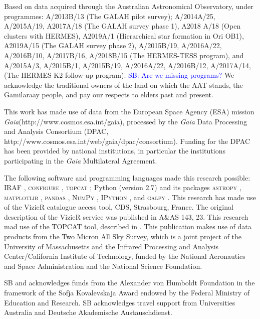 \documentclass[fleqn,usenatbib,useAMS]{mnras}
\newcommand{\Gaia}{\textit{Gaia}\xspace}
\newcommand\SB[1]{\textcolor{blue}{SB: #1}}
\begin{document}
Based on data acquired through the Australian Astronomical Observatory, under programmes: A/2013B/13 (The GALAH pilot survey); A/2014A/25, A/2015A/19, A2017A/18 (The GALAH survey phase 1), A2018 A/18 (Open clusters with HERMES), A2019A/1 (Hierarchical star formation in Ori OB1),  A2019A/15 (The GALAH survey phase 2), A/2015B/19, A/2016A/22, A/2016B/10, A/2017B/16, A/2018B/15 (The HERMES-TESS program), and A/2015A/3, A/2015B/1, A/2015B/19, A/2016A/22, A/2016B/12, A/2017A/14, (The HERMES K2-follow-up program). \SB{Are we missing programs?} We acknowledge the traditional owners of the land on which the AAT stands, the Gamilaraay people, and pay our respects to elders past and present.

This work has made use of data from the European Space Agency (ESA) mission \Gaia (http://www.cosmos.esa.int/gaia), processed by the \Gaia Data Processing and Analysis Consortium (DPAC, http://www.cosmos.esa.int/web/gaia/dpac/consortium). Funding for the DPAC has been provided by national institutions, in particular the institutions participating in the \Gaia Multilateral Agreement. 

The following software and programming languages made this research possible: \textsc{IRAF} \citep{Tody1986,Tody1993}, \textsc{configure} \citep{Miszalski2006}, \textsc{topcat} \citep[version 4.4;][]{Taylor2005}; Python (version 2.7) and its packages {\textsc{astropy}} \citep[version 2.0;][]{Robitaille2013,PriceWhelan2018}, {\textsc{matplotlib}} \citep{matplotlib}, {\textsc{pandas}} \citep[version 0.20.2;][]{McKinney2011}, {\textsc{NumPy}} \citep{numpy}, {\textsc{IPython}} \citep{ipython}, and  \textsc{galpy} \citep[version 1.3;][]{Bovy2015}. This research has made use of the VizieR catalogue access tool, CDS, Strasbourg, France. The original description of the VizieR service was published in A\&AS 143, 23. This research mad use of the TOPCAT tool, described in \citet{Taylor2005}. This publication makes use of data products from the Two Micron All Sky Survey, which is a joint project of the University of Massachusetts and the Infrared Processing and Analysis Center/California Institute of Technology, funded by the National Aeronautics and Space Administration and the National Science Foundation.

SB and acknowledges funds from the Alexander von Humboldt Foundation in the framework of the Sofja Kovalevskaja Award endowed by the Federal Ministry of Education and Research. SB acknowledges travel support from Universities Australia and Deutsche Akademische Austauschdienst.
\end{document}
